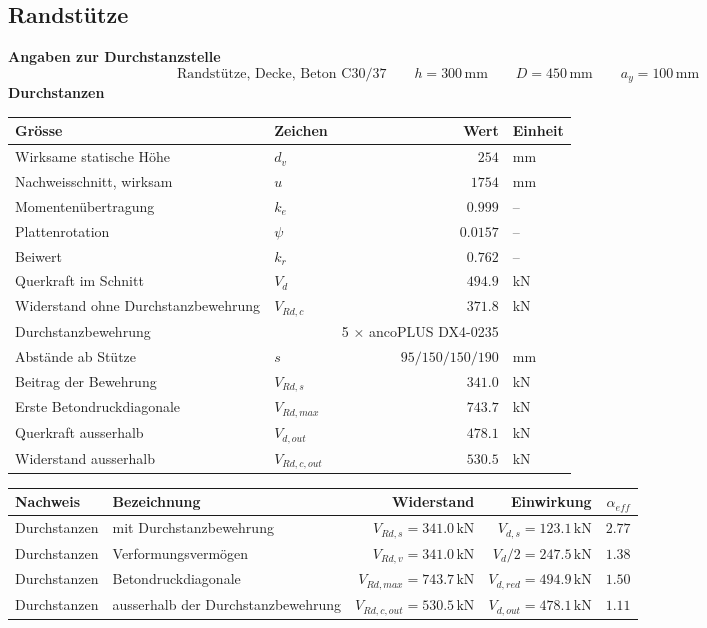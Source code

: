 \documentclass[11pt,a4paper]{article}
\begin{document}
\subsection{Randstütze}
\noindent\textbf{Angaben zur Durchstanzstelle}
\begin{equation*}
\text{Randstütze, Decke, Beton C30/37} \qquad h = 300\,\mathrm{mm} \qquad D = 450\,\mathrm{mm} \qquad a_y = 100\,\mathrm{mm}
\end{equation*}
\noindent\textbf{Durchstanzen}
\begin{longtable}{llrl}
\hline
Grösse & Zeichen & Wert & Einheit \\
\hline
\endhead
Wirksame statische Höhe & $d_v$ & $254$ & mm \\
Nachweisschnitt, wirksam & $u$ & $1754$ & mm \\
Momentenübertragung & $k_e$ & $0.999$ & – \\
Plattenrotation & $\psi$ & $0.0157$ & – \\
Beiwert & $k_r$ & $0.762$ & – \\
Querkraft im Schnitt & $V_d$ & $494.9$ & kN \\
Widerstand ohne Durchstanzbewehrung & $V_{Rd,c}$ & $371.8$ & kN \\
Durchstanzbewehrung &  & 5 × ancoPLUS DX4-0235 &  \\
Abstände ab Stütze & $s$ & $95 / 150 / 150 / 190$ & mm \\
Beitrag der Bewehrung & $V_{Rd,s}$ & $341.0$ & kN \\
Erste Betondruckdiagonale & $V_{Rd,max}$ & $743.7$ & kN \\
Querkraft ausserhalb & $V_{d,out}$ & $478.1$ & kN \\
Widerstand ausserhalb & $V_{Rd,c,out}$ & $530.5$ & kN \\
\hline
\end{longtable}
\begin{xltabular}{\linewidth}{>{\raggedright\arraybackslash}X>{\raggedright\arraybackslash}Xrrr}
\hline
Nachweis & Bezeichnung & Widerstand & Einwirkung & $\alpha_{eff}$ \\
\hline
\endhead
Durchstanzen & mit Durchstanzbewehrung & $V_{Rd,s} = 341.0\,\mathrm{kN}$ & $V_{d,s} = 123.1\,\mathrm{kN}$ & $2.77$ \\
Durchstanzen & Verformungsvermögen & $V_{Rd,v} = 341.0\,\mathrm{kN}$ & $V_d / 2 = 247.5\,\mathrm{kN}$ & $1.38$ \\
Durchstanzen & Betondruckdiagonale & $V_{Rd,max} = 743.7\,\mathrm{kN}$ & $V_{d,red} = 494.9\,\mathrm{kN}$ & $1.50$ \\
Durchstanzen & ausserhalb der Durchstanzbewehrung & $V_{Rd,c,out} = 530.5\,\mathrm{kN}$ & $V_{d,out} = 478.1\,\mathrm{kN}$ & $1.11$ \\
\hline
\end{xltabular}
\end{document}
